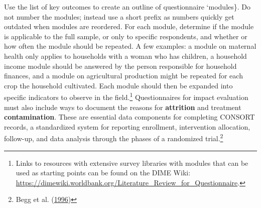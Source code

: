 \documentclass[
]{book}
\begin{document}
Use the list of key outcomes to create an outline of questionnaire `modules\}.
Do not number the modules; instead use a short prefix
as numbers quickly get outdated when modules are reordered.
For each module, determine if the module is applicable to the full sample,
or only to specific respondents,
and whether or how often the module should be repeated.
A few examples:
a module on maternal health only applies
to households with a woman who has children,
a household income module should be answered
by the person responsible for household finances,
and a module on agricultural production
might be repeated for each crop the household cultivated.
Each module should then be expanded
into specific indicators to observe in the field.\footnote{Links to resources with extensive survey libraries with
  modules that can be used as starting points can be found on the DIME Wiki:
  \url{https://dimewiki.worldbank.org/Literature_Review_for_Questionnaire}.}
Questionnaires for impact evaluation
must also include ways to document the reasons for \textbf{attrition} and
treatment \textbf{contamination}.
These are essential data components for completing CONSORT records,
a standardized system for reporting enrollment, intervention allocation, follow-up,
and data analysis through the phases of a randomized trial.\footnote{Begg et al. (\protect\hyperlink{ref-begg1996improving}{1996})}
\end{document}
